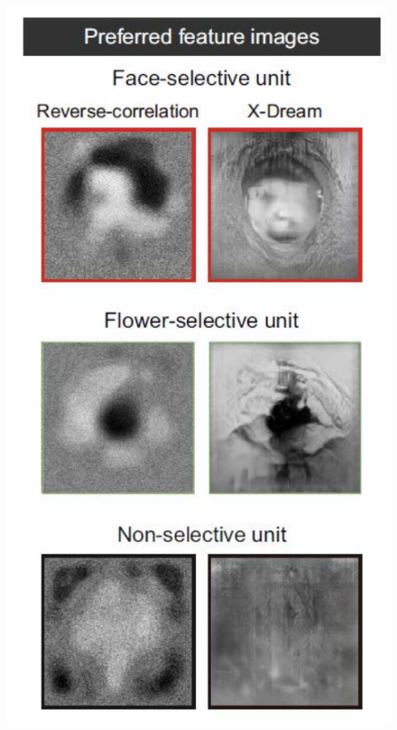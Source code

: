 \documentclass[final,3p,times,twocolumn]{elsarticle}
\begin{document}
\begin{figure}[htbp]
	\centering
	
	\subfigure%
	{
		\begin{minipage}[t]{0.8\linewidth}
			\centering
			\includegraphics[width=1.0\textwidth]{figs/fig_2_c.pdf}
		\end{minipage}%
	}%
	

\end{figure}
\end{document}
